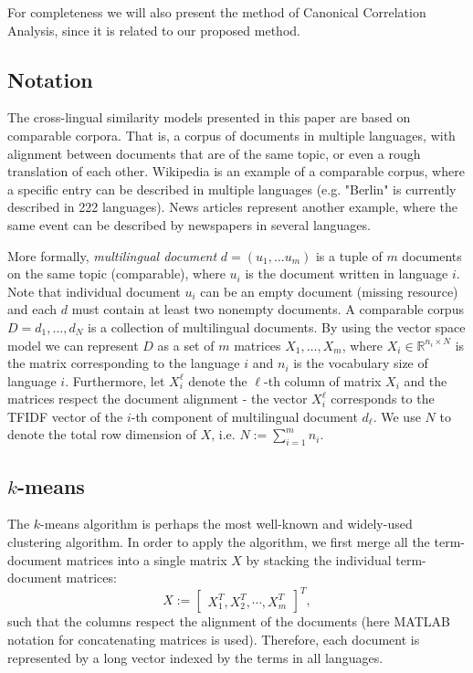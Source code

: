 \documentclass[twoside,11pt]{article}
\newcommand{\RR}{\mathbb{R}}
\begin{document}
For completeness we will also present the method of Canonical Correlation Analysis, since it is related to our proposed method.

\subsection{Notation}

The cross-lingual similarity models presented in this paper are based on comparable corpora. That is, a corpus of documents in multiple languages, with alignment between documents that are of the same topic, or even a rough translation of each other. Wikipedia is an example of a comparable corpus, where a specific entry can be described in multiple languages (e.g. "Berlin" is currently described in 222 languages). News articles represent another example, where the same event can be described by newspapers in several languages.

More formally, \emph{multilingual document} $d = (u_1,\ldots u_m)$ is a tuple of $m$ documents on the same topic (comparable), where $u_i$ is the document written in language $i$. Note that individual document $u_i$ can be an empty document (missing resource) and each $d$ must contain at least two nonempty documents. A comparable corpus $D = {d_1, \ldots, d_N}$ is a collection of multilingual documents. By using the vector space model we can represent $D$ as a set of $m$ matrices $X_1,\ldots,X_m$, where $X_i \in \RR^{n_i \times N}$ is the matrix corresponding to the language $i$ and $n_i$ is the vocabulary size of language $i$. Furthermore, let $X_i^{\ell}$ denote the $\ell$-th column of matrix $X_i$ and the matrices respect the document alignment - the vector $X_i^\ell$ corresponds to the TFIDF vector of the $i$-th component of multilingual document $d_\ell$. We use $N$ to denote the total row dimension of $X$, i.e. $N:= \sum_{i=1}^m n_i$.


\subsection{$k$-means}

The $k$-means algorithm is perhaps the most well-known and widely-used clustering algorithm. In order to apply the algorithm, we first merge all the term-document matrices into a single matrix $X$ by stacking the individual term-document matrices:
$$X := \begin{bmatrix}X_1^T ,X_2^T, \cdots, X_m^T \end{bmatrix}^T,$$
such that the columns respect the alignment of the documents (here MATLAB notation for concatenating matrices is used). Therefore, each document  is represented by a long vector indexed by the terms in all languages.
\end{document}
